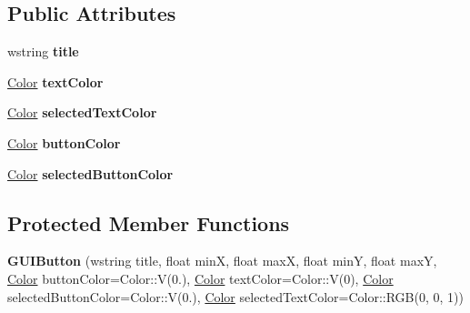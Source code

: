 \subsection*{Public Attributes}
\begin{DoxyCompactItemize}
\item 
\hypertarget{structGUIButton_a7d9957718c2bb7d1d84be180e61125b1}{wstring {\bfseries title}}\label{structGUIButton_a7d9957718c2bb7d1d84be180e61125b1}

\item 
\hypertarget{structGUIButton_ae97fba0f7fe08cc7f7e9cf9335594528}{\hyperlink{structColor}{Color} {\bfseries text\+Color}}\label{structGUIButton_ae97fba0f7fe08cc7f7e9cf9335594528}

\item 
\hypertarget{structGUIButton_ac1df1c582d08dec6b27e28d94aae0317}{\hyperlink{structColor}{Color} {\bfseries selected\+Text\+Color}}\label{structGUIButton_ac1df1c582d08dec6b27e28d94aae0317}

\item 
\hypertarget{structGUIButton_a6b9d51eaad2ec306c0e2eb8d8b85d715}{\hyperlink{structColor}{Color} {\bfseries button\+Color}}\label{structGUIButton_a6b9d51eaad2ec306c0e2eb8d8b85d715}

\item 
\hypertarget{structGUIButton_a5005955afb67ce2f454b10016be97f60}{\hyperlink{structColor}{Color} {\bfseries selected\+Button\+Color}}\label{structGUIButton_a5005955afb67ce2f454b10016be97f60}

\end{DoxyCompactItemize}
\subsection*{Protected Member Functions}
\begin{DoxyCompactItemize}
\item 
\hypertarget{structGUIButton_a09f2e5dce4aa4e6b54720d03058ed54b}{{\bfseries G\+U\+I\+Button} (wstring title, float min\+X, float max\+X, float min\+Y, float max\+Y, \hyperlink{structColor}{Color} button\+Color=Color\+::\+V(0.), \hyperlink{structColor}{Color} text\+Color=Color\+::\+V(0), \hyperlink{structColor}{Color} selected\+Button\+Color=Color\+::\+V(0.), \hyperlink{structColor}{Color} selected\+Text\+Color=Color\+::\+R\+G\+B(0, 0, 1))}\label{structGUIButton_a09f2e5dce4aa4e6b54720d03058ed54b}

\end{DoxyCompactItemize}
